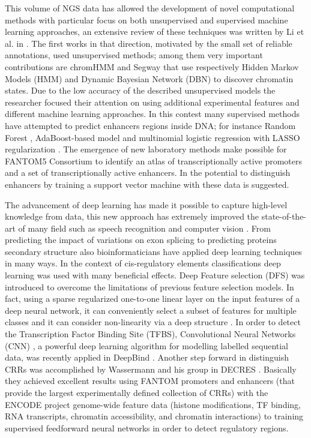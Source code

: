 This volume of NGS data has allowed the development of novel computational
methods with particular focus on both unsupervised and supervised machine
learning approaches, an extensive review of these techniques was written by Li et al. in \cite{LiMLReview}. The first works in that direction, motivated by the small set of reliable annotations, used unsupervised methods; among them very important contributions are chromHMM \cite{ernst2012chromhmm}
and Segway \cite{HoffmanSegway} that use respectively Hidden Markov Models
(HMM) and Dynamic Bayesian Network (DBN) to discover chromatin states. Due
to the low accuracy of the described unsupervised models the researcher focused their attention on using additional experimental features and
different machine learning approaches. In this contest many supervised
methods have attempted to predict enhancers regions inside DNA; for
instance Random Forest \cite{RFECS}, AdaBoost-based model
\cite{DELTA_adaboost} and multinomial logistic regression with LASSO
regularization \cite{ChenMultinomialLASSORegression}. The emergence of new
laboratory methods make possible for FANTOM5 Consortium to identify an
atlas of transcriptionally active promoters and a set of transcriptionally
active enhancers. In \cite{DEEP} the potential to distinguish enhancers by
training a support vector machine with these data is suggested.

The advancement of deep learning has made it possible to capture
high-level knowledge from data, this new approach has extremely improved
the state-of-the-art of many field such as speech recognition and computer
vision \cite{lecun2015deeplearning}. From predicting the impact of
variations on exon splicing \cite{XiongExon} to predicting proteins
secondary structure \cite{SecondaryStructure} also bioinformaticians have
applied deep learning techniques in many ways. In the context of
cis-regulatory elements classifications deep learning was used with many
beneficial effects. Deep Feature selection (DFS) was introduced to
overcome the limitations of previous feature selection models. In fact,
using a sparse regularized one-to-one linear layer on the input features
of a deep neural network, it can conveniently select a subset of features
for multiple classes and it can consider non-linearity via a deep
structure \cite{LiYifengDFS}. In order to detect the Transcription Factor
Binding Site (TFBS), Convolutional Neural Networks (CNN) \cite{LecunCNN,
MartinezCNN}, a powerful deep learning algorithm for modelling labelled
sequential data, was recently applied in DeepBind \cite{AlipanahiDeepBind}.
Another step forward in distinguish CRRs was accomplished by Wassermann
and his group in DECRES \cite{WassermannDECRES}. Basically they achieved
excellent results using FANTOM promoters and enhancers (that provide the
largest experimentally defined collection of CRRs) with the ENCODE project
genome-wide feature data (histone modifications, TF binding, RNA
transcripts, chromatin accessibility, and chromatin interactions) to
training supervised feedforward neural networks in order to detect
regulatory regions.

